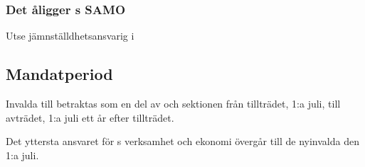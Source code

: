 \subsubsection{Det åligger \STYRIT{}s SAMO}
\begin{att}
	\item Utse jämnställdhetsansvarig i \STYRIT
\end{att}

\subsection{Mandatperiod}
Invalda till \STYRIT{} betraktas som en del av \STYRIT{} och sektionen från tillträdet, 1:a juli, till avträdet, 1:a juli ett år efter tillträdet.

Det yttersta ansvaret för \STYRIT{}s verksamhet och ekonomi övergår till de nyinvalda den 1:a juli.

